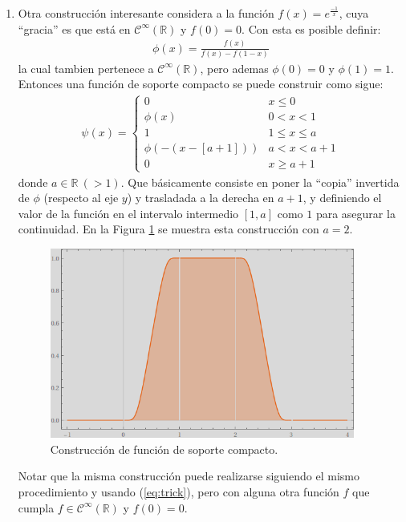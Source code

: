 \documentclass[spanish, fleqn]{article}
\begin{document}
\begin{description}
\begin{enumerate}
    \item Otra construcción interesante considera a la función $\displaystyle f(x) = e^{\frac{-1}{x}}$, cuya ``gracia'' es que está en $\mathcal{C}^{\infty}(\mathbb{R})$ y $f(0)=0$. Con esta es posible definir:
    \begin{align}
        \phi(x) = \frac{f(x)}{f(x)-f(1-x)}
    \label{eq:trick}
    \end{align}
    la cual tambien pertenece a $\mathcal{C}^{\infty}(\mathbb{R})$, pero ademas $\phi(0)=0$ y $\phi(1)=1$. Entonces una función de soporte compacto se puede construir como sigue:
    \begin{align*}
        \psi(x) =
        \begin{cases}
        0 & x \leq 0 \\
        \phi(x) & 0 < x <1 \\
        1 & 1 \leq x \leq a \\
        \phi(-(x-[a+1])) & a < x < a+1 \\
        0 & x \geq a+1
        \end{cases}    
    \end{align*}
    donde $a \in \mathbb{R}\ (> 1)$. Que básicamente consiste en poner la ``copia'' invertida de $\phi$ (respecto al eje $y$) y trasladada a la derecha en $a+1$, y definiendo el valor de la función en el intervalo intermedio $[1,a]$ como $1$ para asegurar la continuidad. En la Figura \ref{fig:const} se muestra esta construcción con $a=2$.
    \begin{figure}[htpb!]
    \centering
    \includegraphics[width=10cm]{construction}
    \caption{Construcción de función de soporte compacto.}
    \label{fig:const}
    \end{figure}
    
    Notar que la misma construcción puede realizarse siguiendo el mismo procedimiento y usando (\ref{eq:trick}), pero con
    alguna otra función $f$ que cumpla $f \in \mathcal{C}^{\infty}(\mathbb{R})$ y $f(0)=0$.


\end{enumerate}
\end{description}
\end{document}

